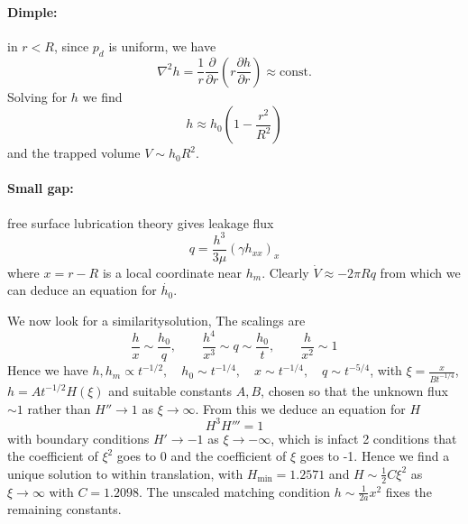 \documentclass{jknotes}
\begin{document}
\paragraph{Dimple:} in $r < R$, since $p_d$ is uniform, we have
\begin{equation}
	\nabla^2 h = \frac{1}{r} \frac{\partial}{\partial r} \left( r \frac{\partial
	h}{\partial r}\right) \approx \text{const.}
\end{equation}
Solving for $h$ we find
\begin{equation}
	h \approx h_0 \left( 1- \frac{r^2}{R^2}\right)
\end{equation}
and the trapped volume $V \sim h_0 R^2$.

\paragraph{Small gap:} free surface lubrication theory gives leakage flux 
\begin{equation}
	q = \frac{h^3}{3\mu} (\gamma h_{xx})_x
\end{equation}
where $x = r-R$ is a local coordinate near $h_m$. Clearly $\dot{V} \approx
-2\pi R q $ from which we can deduce an equation for $\dot{h_0}$.

\begin{center}
\end{center}

We now look for a similaritysolution, The scalings are
\begin{equation}
	\frac{h}{x} \sim \frac{h_0}{q}, \hspace{2em} \frac{h^4}{x^3} \sim q \sim
	\frac{h_0}{t}, \hspace{2em} \frac{h}{x^2} \sim 1
\end{equation}
Hence we have $h, h_m \propto t^{-1/2}, \hspace{1em} h_0 \sim t^{-1/4},
\hspace{1em} x \sim t^{-1/4}, \hspace{1em} q \sim t^{-5/4}$, with $\xi =
\frac{x}{Bt^{-1/4}}$, $h = At^{-1/2}H(\xi)$ and suitable constants $A, B$,
chosen so that the unknown flux $\sim 1$ rather than $H'' \to 1$ as $\xi \to
\infty$. From this we deduce an equation for $H$
\begin{equation}
	H^3 H''' = 1
\end{equation}
with boundary conditions $H' \to -1$ as $\xi \to -\infty$, which is infact 2
conditions that the coefficient of $\xi^2$ goes to 0 and the coefficient of
$\xi$ goes to -1. Hence we find a unique solution to within translation, with
$H_{\text{min}} = 1.2571$ and $H \sim \frac{1}{2}C \xi^2$ as $\xi \to \infty$
with $C = 1.2098$. The unscaled matching condition $h \sim \frac{1}{2a} x^2$
fixes the remaining constants.
\end{document}
